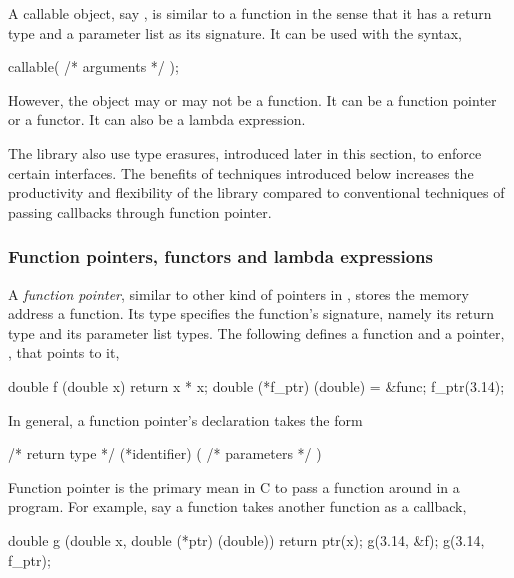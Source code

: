 A callable object, say , is similar to a function in the
sense that it has a return type and a parameter list as its signature. It can
be used with the syntax,
\begin{cppcode}
callable( /* arguments */ );
\end{cppcode}
However, the object may or may not be a function. It can be a function pointer
or a functor. It can also be a \cppoo lambda expression.

The library also use type erasures, introduced later in this section, to
enforce certain interfaces. The benefits of techniques introduced below
increases the productivity and flexibility of the library compared to
conventional techniques of passing callbacks through function pointer.

\subsubsection{Function pointers, functors and lambda expressions}
\label{ssub:Function pointers, functors and lambda expressions}

A \emph{function pointer}, similar to other kind of pointers in \cpp, stores
the memory address a function. Its type specifies the function's signature,
namely its return type and its parameter list types. The following defines a
function and a pointer, , that points to it,
\begin{cppcode}
double f (double x) { return x * x; }
double (*f_ptr) (double) = &func;
f_ptr(3.14);
\end{cppcode}
In general, a function pointer's declaration takes the form
\begin{cppcode}
/* return type */ (*identifier) ( /* parameters */ )
\end{cppcode}
Function pointer is the primary mean in C to pass a function around in a
program. For example, say a function takes another function as a callback,
\begin{cppcode}
double g (double x, double (*ptr) (double)) { return ptr(x); }
g(3.14, &f);
g(3.14, f_ptr);
\end{cppcode}

